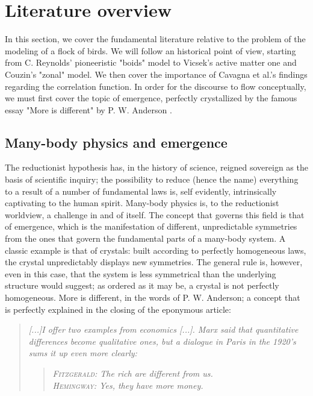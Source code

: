\section{Literature overview}
In this section, we cover the fundamental literature relative to the problem of the modeling of a flock of birds. We will follow an historical point of view, starting from C. Reynolds' pioneeristic "boids" model to Vicsek's active matter one and Couzin's "zonal" model. We then cover the importance of Cavagna et al.'s findings regarding the correlation function. In order for the discourse to flow conceptually, we must first cover the topic of emergence, perfectly crystallized by the famous essay "More is different" by P. W. Anderson \cite{more_is_different}.

\subsection{Many-body physics and emergence}
The reductionist hypothesis has, in the history of science, reigned sovereign as the basis of scientific inquiry; the possibility to reduce (hence the name) everything to a result of a number of fundamental laws is, self evidently, intrinsically captivating to the human spirit. Many-body physics is, to the reductionist worldview, a challenge in and of itself. The concept that governs this field is that of emergence, which is the manifestation of different, unpredictable symmetries from the ones that govern the fundamental parts of a many-body system.  A classic example is that of crystals: built according to perfectly homogeneous laws, the crystal unpredictably displays new symmetries. The general rule is, however, even in this case, that the system is less symmetrical than the underlying structure would suggest; as ordered as it
may be, a crystal is not perfectly homogeneous. More is different, in the words of P. W. Anderson; a concept that is perfectly explained in the closing of the eponymous article:

\begin{quote}
    \textit{ [...]I offer two examples from economics [...]. Marx said that quantitative differences become qualitative ones, but a dialogue in Paris in the 1920's sums it up even more clearly:}
    \begin{quote}
        \textit{\textsc{Fitzgerald}: The rich are different from us. \\
            \textsc{Hemingway}: Yes, they have more money. }\cite{more_is_different}
    \end{quote}
\end{quote}


